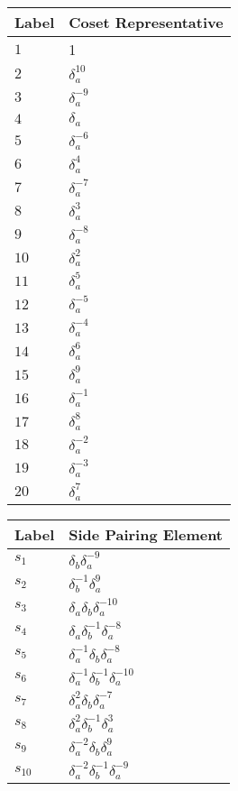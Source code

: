 \documentclass{article}
\begin{document}

\begin{center}
\begin{tabular}{ll}
\toprule
Label & Coset Representative\\
\midrule
$1$ & 1 \\
$2$ & $\delta_a^{10}$ \\
$3$ & $\delta_a^{-9}$ \\
$4$ & $\delta_a^{}$ \\
$5$ & $\delta_a^{-6}$ \\
$6$ & $\delta_a^{4}$ \\
$7$ & $\delta_a^{-7}$ \\
$8$ & $\delta_a^{3}$ \\
$9$ & $\delta_a^{-8}$ \\
$10$ & $\delta_a^{2}$ \\
$11$ & $\delta_a^{5}$ \\
$12$ & $\delta_a^{-5}$ \\
$13$ & $\delta_a^{-4}$ \\
$14$ & $\delta_a^{6}$ \\
$15$ & $\delta_a^{9}$ \\
$16$ & $\delta_a^{-1}$ \\
$17$ & $\delta_a^{8}$ \\
$18$ & $\delta_a^{-2}$ \\
$19$ & $\delta_a^{-3}$ \\
$20$ & $\delta_a^{7}$ \\
\bottomrule
\end{tabular}
\hfill
\begin{tabular}{ll}
\toprule
Label & Side Pairing Element\\
\midrule
$s_{1}$ & $\delta_b^{}\delta_a^{-9}$ \\
$s_{2}$ & $\delta_b^{-1}\delta_a^{9}$ \\
$s_{3}$ & $\delta_a^{}\delta_b^{}\delta_a^{-10}$ \\
$s_{4}$ & $\delta_a^{}\delta_b^{-1}\delta_a^{-8}$ \\
$s_{5}$ & $\delta_a^{-1}\delta_b^{}\delta_a^{-8}$ \\
$s_{6}$ & $\delta_a^{-1}\delta_b^{-1}\delta_a^{-10}$ \\
$s_{7}$ & $\delta_a^{2}\delta_b^{}\delta_a^{-7}$ \\
$s_{8}$ & $\delta_a^{2}\delta_b^{-1}\delta_a^{3}$ \\
$s_{9}$ & $\delta_a^{-2}\delta_b^{}\delta_a^{9}$ \\
$s_{10}$ & $\delta_a^{-2}\delta_b^{-1}\delta_a^{-9}$ \\

\end{tabular}
\end{center}
\end{document}
